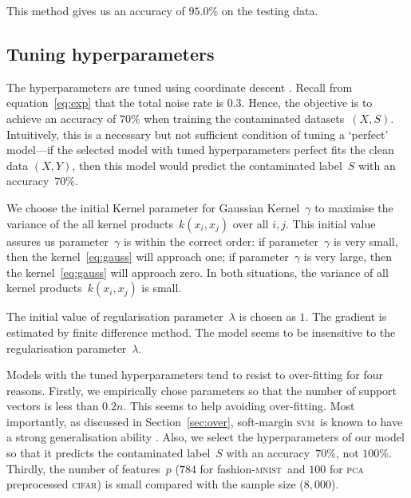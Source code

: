 \documentclass[12pt]{article} %
\newcommand{\svm}{\textsc{svm}}
\newcommand{\mnist}{fashion-\textsc{mnist}}
\begin{document}
This method gives us an accuracy of $95.0\%$ on the testing data.


\subsection{Tuning hyperparameters}\label{tune}
The hyperparameters are tuned using coordinate descent \citep{hastie01statisticallearning}. Recall from equation~\eqref{eq:exp} that the total noise rate is 0.3. Hence,  the objective is to achieve an accuracy of $70\%$ when training the contaminated datasets~$(X,S)$. Intuitively, this is a necessary but not sufficient condition of tuning a `perfect' model---if the selected model with tuned hyperparameters perfect fits the clean data $(X,Y)$, then this model would predict the contaminated label~$S$ with an accuracy~$70\%$.

We choose the initial Kernel parameter for Gaussian Kernel~$\gamma$  to maximise the variance of the all kernel products~$k(x_i,x_j)$ over all $i,j$. 
This initial value assures us parameter~$\gamma$ is within the correct order: if parameter~$\gamma$ is very small, then the kernel~\eqref{eq:gauss} will approach one; if parameter~$\gamma$ is very large, then the kernel~\eqref{eq:gauss} will approach zero. In both situations, the variance of all kernel products~$k(x_i,x_j)$ is small.

The initial value of regularisation parameter~$\lambda$ is chosen as $1$.
The gradient is estimated by finite difference method.
The model seems to be insensitive to the regularisation parameter~$\lambda$.

Models with the tuned hyperparameters tend to resist to over-fitting for four reasons. Firstly, we empirically chose parameters so that the number of support vectors is less than $0.2n$. This seems to help avoiding over-fitting. Most importantly, as discussed in Section~\ref{sec:over}, soft-margin \svm\ is known to have a strong generalisation ability \citep{NIPS2012_4500,Cortes1995,Seeger:2003:PGE:944919.944929}. Also, we select the hyperparameters of our model so that it predicts the contaminated label~$S$ with an accuracy~$70\%$, not $100\%$. Thirdly, the number of features~$p$ ($784$ for \mnist\ and $100$ for \textsc{pca} preprocessed \textsc{cifar}) is small compared with the sample size ($8,000$).
\end{document}
